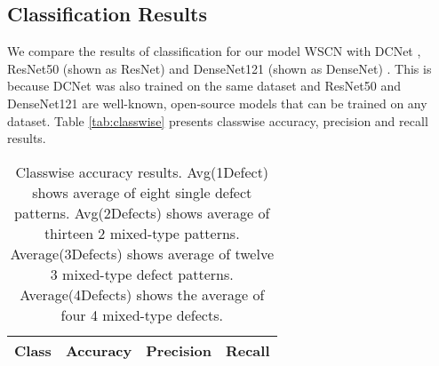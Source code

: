 \subsection{Classification Results}\label{sec:classification}

We compare the results of classification for our model WSCN with DCNet \cite{wang2020deformable}, ResNet50 (shown as ResNet) \cite{he2016deep} and DenseNet121 (shown as DenseNet) \cite{huang2017densely}. This is because DCNet was also trained on the same dataset and ResNet50 and DenseNet121 are well-known, open-source models that can be trained on any dataset.
Table \ref{tab:classwise} presents classwise accuracy, precision and recall results. 

\begin{table*}[htbp]
  \centering
  \caption{Classwise accuracy results. Avg(1Defect) shows average of eight single defect patterns. Avg(2Defects) shows average of thirteen 2 mixed-type patterns. Average(3Defects) shows average of twelve 3 mixed-type defect patterns. Average(4Defects) shows the average of  four 4 mixed-type defects.}
    \begin{tabular}{|c|r|r|r|r|r|r|r|r|r|r|r|r|}
    \hline
Class  & \multicolumn{4}{c|}{Accuracy} & \multicolumn{4}{c|}{Precision} & \multicolumn{4}{c|}{Recall} \\    \hline
    

\end{tabular}
\end{table*}
